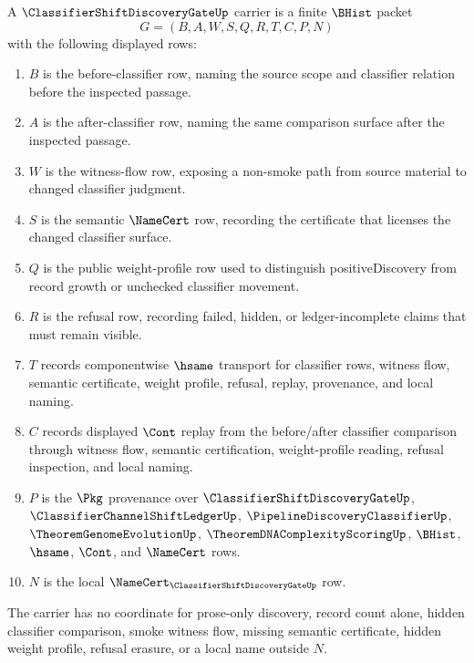 \begin{definition}
\label{def:classifier-shift-discovery-gate-carrier}
A $\ClassifierShiftDiscoveryGateUp$ carrier is a finite $\BHist$ packet
$$
G=(B,A,W,S,Q,R,T,C,P,N)
$$
with the following displayed rows:
\begin{enumerate}
\item $B$ is the before-classifier row, naming the source scope and classifier relation before the inspected passage.
\item $A$ is the after-classifier row, naming the same comparison surface after the inspected passage.
\item $W$ is the witness-flow row, exposing a non-smoke path from source material to changed classifier judgment.
\item $S$ is the semantic $\NameCert$ row, recording the certificate that licenses the changed classifier surface.
\item $Q$ is the public weight-profile row used to distinguish positiveDiscovery from record growth or unchecked classifier movement.
\item $R$ is the refusal row, recording failed, hidden, or ledger-incomplete claims that must remain visible.
\item $T$ records componentwise $\hsame$ transport for classifier rows, witness flow, semantic certificate, weight profile, refusal, replay, provenance, and local naming.
\item $C$ records displayed $\Cont$ replay from the before/after classifier comparison through witness flow, semantic certification, weight-profile reading, refusal inspection, and local naming.
\item $P$ is the $\Pkg$ provenance over $\ClassifierShiftDiscoveryGateUp$, $\ClassifierChannelShiftLedgerUp$, $\PipelineDiscoveryClassifierUp$, $\TheoremGenomeEvolutionUp$, $\TheoremDNAComplexityScoringUp$, $\BHist$, $\hsame$, $\Cont$, and $\NameCert$ rows.
\item $N$ is the local $\NameCert_{\ClassifierShiftDiscoveryGateUp}$ row.
\end{enumerate}
The carrier has no coordinate for prose-only discovery, record count alone, hidden classifier comparison, smoke witness flow, missing semantic certificate, hidden weight profile, refusal erasure, or a local name outside $N$.
\end{definition}

